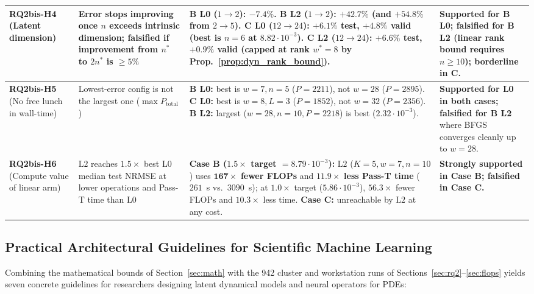\begin{table}[!htbp]
{\begin{tabular}{@{}p{2.2cm}p{4.1cm}p{5.7cm}p{3.2cm}@{}}
\midrule
\textbf{RQ2bis-H4} \newline (Latent dimension) & Error stops improving once $n$ exceeds intrinsic dimension; falsified if improvement from $n^*$ to $2n^*$ is $\ge 5\%$ & \textbf{B L0 ($1\to 2$):} $-7.4\%$. \textbf{B L2 ($1\to 2$):} $\mathbf{+42.7\%}$ (and $+54.8\%$ from $2\to 5$). \textbf{C L0 ($12\to 24$):} $+6.1\%$ test, $+4.8\%$ valid (best is $n=6$ at $8.82\cdot 10^{-3}$). \textbf{C L2 ($12\to 24$):} $+6.6\%$ test, $+0.9\%$ valid (capped at rank $w^*=8$ by Prop.~\ref{prop:dyn_rank_bound}). & \textbf{Supported for B L0; falsified for B L2} (linear rank bound requires $n \ge 10$); borderline in C. \\
\midrule
\textbf{RQ2bis-H5} \newline (No free lunch in wall-time) & Lowest-error config is not the largest one ($\max P_{\mathrm{total}}$) & \textbf{B L0:} best is $w=7, n=5$ ($P=2211$), not $w=28$ ($P=2895$). \textbf{C L0:} best is $w=8, L=3$ ($P=1852$), not $w=32$ ($P=2356$). \textbf{B L2:} largest ($w=28, n=10, P=2218$) is best ($2.32\cdot 10^{-3}$). & \textbf{Supported for L0 in both cases; falsified for B L2} where BFGS converges cleanly up to $w=28$. \\
\midrule
\textbf{RQ2bis-H6} \newline (Compute value of linear arm) & $\mathrm{L2}$ reaches $1.5\times$ best $\mathrm{L0}$ median test NRMSE at lower operations and Pass-T time than $\mathrm{L0}$ & \textbf{Case B ($1.5\times$ target $= 8.79\cdot 10^{-3}$):} $\mathrm{L2}$ ($K=5, w=7, n=10$) uses $\mathbf{167\times}$ \textbf{fewer FLOPs} and $\mathbf{11.9\times}$ \textbf{less Pass-T time} ($261$~s vs.\ $3090$~s); at $1.0\times$ target ($5.86\cdot 10^{-3}$), $\mathbf{56.3\times}$ fewer FLOPs and $\mathbf{10.3\times}$ less time. \textbf{Case C:} unreachable by $\mathrm{L2}$ at any cost. & \textbf{Strongly supported in Case B; falsified in Case C.} \\
\bottomrule
\end{tabular}
}
\end{table}

\subsection{Practical Architectural Guidelines for Scientific Machine Learning}

Combining the mathematical bounds of Section~\ref{sec:math} with the 942 cluster and workstation runs of Sections~\ref{sec:rq2}--\ref{sec:flops} yields seven concrete guidelines for researchers designing latent dynamical models and neural operators for PDEs:

